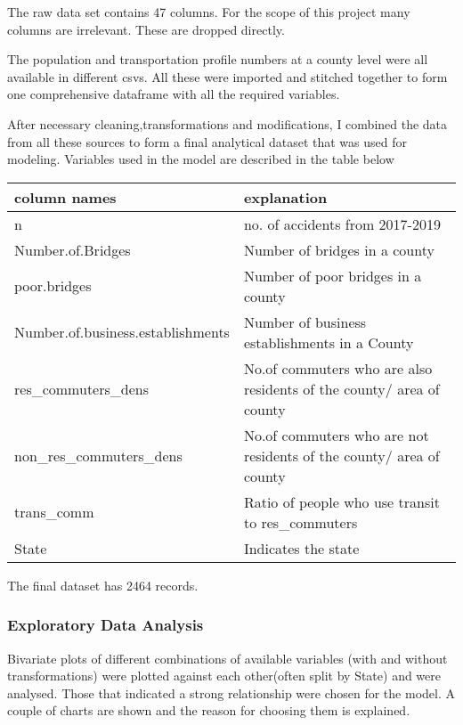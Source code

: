 \documentclass[
]{article}
\begin{document}
The raw data set contains 47 columns. For the scope of this project many
columns are irrelevant. These are dropped directly.

The population and transportation profile numbers at a county level were
all available in different csvs. All these were imported and stitched
together to form one comprehensive dataframe with all the required
variables.

After necessary cleaning,transformations and modifications, I combined
the data from all these sources to form a final analytical dataset that
was used for modeling. Variables used in the model are described in the
table below

\begin{longtable}[]{@{}
  >{\centering\arraybackslash}p{}
  >{\raggedright\arraybackslash}p{}@{}}
\toprule
column names & explanation \\
\midrule
\endhead
n & no. of accidents from 2017-2019 \\
Number.of.Bridges & Number of bridges in a county \\
poor.bridges & Number of poor bridges in a county \\
Number.of.business.establishments & Number of business establishments in
a County \\
res\_commuters\_dens & No.of commuters who are also residents of the
county/ area of county \\
non\_res\_commuters\_dens & No.of commuters who are not residents of the
county/ area of county \\
trans\_comm & Ratio of people who use transit to res\_commuters \\
State & Indicates the state \\
\bottomrule
\end{longtable}

The final dataset has 2464 records.

\hypertarget{exploratory-data-analysis}{%
\subsubsection{Exploratory Data
Analysis}\label{exploratory-data-analysis}}

Bivariate plots of different combinations of available variables (with
and without transformations) were plotted against each other(often split
by State) and were analysed. Those that indicated a strong relationship
were chosen for the model. A couple of charts are shown and the reason
for choosing them is explained.
\end{document}
